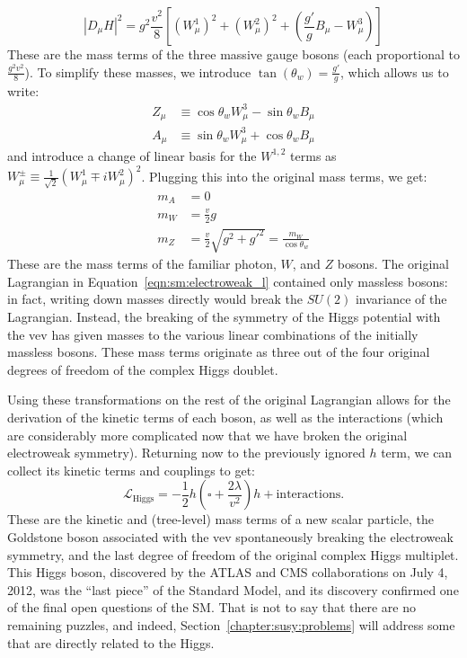 %
\begin{equation}
|D_\mu H|^2 = g^2 \frac{v^2}{8} \left[ (W_\mu^1)^2 + (W_\mu^2)^2 + \left( \frac{g'}{g} B_\mu - W_\mu^3 \right) \right]
\end{equation}
%
These are the mass terms of the three massive gauge bosons (each proportional to $\frac{g^2 v^2}{8}$). To simplify these masses, we introduce $\tan(\theta_w) = \frac{g'}{g}$, which allows us to write:
%
\begin{align}
Z_\mu &\equiv \cos \theta_w W_\mu^3 - \sin \theta_w B_\mu\\
A_\mu &\equiv \sin \theta_w W_\mu^3 + \cos \theta_w B_\mu
\end{align}
%
and introduce a change of linear basis for the $W^{1,2}$ terms as $W_\mu^{\pm} \equiv \frac{1}{\sqrt{2}} (W_\mu^1 \mp i W_\mu^2)^2$. Plugging this into the original mass terms, we get:
%
\begin{align}
m_A &= 0\\
m_W &= \frac{v}{2} g\\
m_Z &= \frac{v}{2} \sqrt{g^2 +g'^2} = \frac{m_W}{\cos \theta_w}
\end{align}
%
These are the mass terms of the familiar photon, $W$, and $Z$ bosons. The original Lagrangian in Equation~\ref{eqn:sm:electroweak_l} contained only massless bosons: in fact, writing down masses directly would break the $SU(2)$ invariance of the Lagrangian. Instead, the breaking of the symmetry of the Higgs potential with the vev has given masses to the various linear combinations of the initially massless bosons. These mass terms originate as three out of the four original degrees of freedom of the complex Higgs doublet.   

Using these transformations on the rest of the original Lagrangian allows for the derivation of the kinetic terms of each boson, as well as the interactions (which are considerably more complicated now that we have broken the original electroweak symmetry). Returning now to the previously ignored $h$ term, we can collect its kinetic terms and couplings to get:
%
\begin{equation}
\mathcal{L}_\mathrm{Higgs} = - \frac{1}{2} h \left(\square + \frac{2\lambda}{v^2}\right) h + \mathrm{interactions}.
\end{equation}
%
These are the kinetic and (tree-level) mass terms of a new scalar particle, the Goldstone boson associated with the vev spontaneously breaking the electroweak symmetry, and the last degree of freedom of the original complex Higgs multiplet. This Higgs boson, discovered by the ATLAS and CMS collaborations on July 4, 2012, was the ``last piece'' of the Standard Model, and its discovery confirmed one of the final open questions of the SM. That is not to say that there are no remaining puzzles, and indeed, Section~\ref{chapter:susy:problems} will address some that are directly related to the Higgs.

